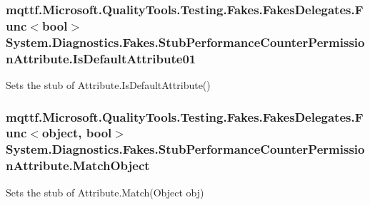 \hypertarget{class_system_1_1_diagnostics_1_1_fakes_1_1_stub_performance_counter_permission_attribute_a2014b54fad7ff677d07337ce8640ccac}{
\subsubsection[{Is\-Default\-Attribute01}]{\setlength{\rightskip}{0pt plus 5cm}mqttf.\-Microsoft.\-Quality\-Tools.\-Testing.\-Fakes.\-Fakes\-Delegates.\-Func$<$bool$>$ System.\-Diagnostics.\-Fakes.\-Stub\-Performance\-Counter\-Permission\-Attribute.\-Is\-Default\-Attribute01}}\label{class_system_1_1_diagnostics_1_1_fakes_1_1_stub_performance_counter_permission_attribute_a2014b54fad7ff677d07337ce8640ccac}


Sets the stub of Attribute.\-Is\-Default\-Attribute()

\hypertarget{class_system_1_1_diagnostics_1_1_fakes_1_1_stub_performance_counter_permission_attribute_a56811790e3f50f35e22236123b52b5db}{
\subsubsection[{Match\-Object}]{\setlength{\rightskip}{0pt plus 5cm}mqttf.\-Microsoft.\-Quality\-Tools.\-Testing.\-Fakes.\-Fakes\-Delegates.\-Func$<$object, bool$>$ System.\-Diagnostics.\-Fakes.\-Stub\-Performance\-Counter\-Permission\-Attribute.\-Match\-Object}}\label{class_system_1_1_diagnostics_1_1_fakes_1_1_stub_performance_counter_permission_attribute_a56811790e3f50f35e22236123b52b5db}


Sets the stub of Attribute.\-Match(\-Object obj)

